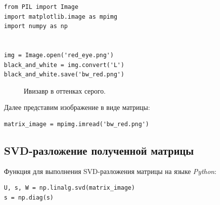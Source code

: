 \documentclass[a5paper, 10pt]{article}
\theoremstyle{definition}
\theoremstyle{plain}
\theoremstyle{remark}
\begin{document}
\begin{center}
\begin{lstlisting}[label=some-code,caption={Код для преобразования изображения к оттенкам серого}]
from PIL import Image
import matplotlib.image as mpimg
import numpy as np


img = Image.open('red_eye.png')
black_and_white = img.convert('L')
black_and_white.save('bw_red.png')
\end{lstlisting}
\end{center}

\begin{figure}[h!]
\caption{Ивизавр в оттенках серого.}
\end{figure}

Далее представим изображение в виде матрицы:
\begin{center}
\begin{lstlisting}[label=some-code,caption={Получение изображения в виде матрицы}]
matrix_image = mpimg.imread('bw_red.png')
\end{lstlisting}
\end{center}

\subsection{SVD-разложение полученной матрицы}
Функция для выполнения SVD-разложения матрицы на языке \textit{Python}:
\begin{center}
\begin{lstlisting}[label=some-code,caption={SVD-разложение матрицы}]
U, s, W = np.linalg.svd(matrix_image)
s = np.diag(s)
\end{lstlisting}
\end{center}
\end{document}
